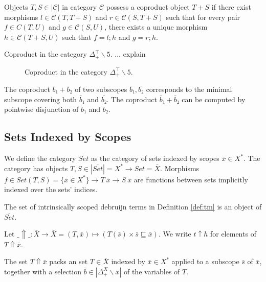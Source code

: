 \documentclass[runningheads]{llncs}
\begin{document}
\begin{definition}
  Objects $T, S ∈ |𝒞|$ in category $𝒞$ possess a coproduct object $T + S$ if there exist morphisms $l ∈ 𝒞(T, T + S)$ and $r ∈ 𝒞(S, T + S)$ such that for every pair $f ∈ C(T,U)$ and $g ∈ 𝒞(S,U)$, there exists a unique morphism $h ∈ 𝒞(T + S,U)$ such that $f = l;h$ and $g = r;h$.
\end{definition}
\begin{example}
  Coproduct in the category $Δ_+^⊤∖5$. ... explain
  \begin{figure}[h]
    \centering
    \caption{Coproduct in the category $Δ_+^⊤∖5$.}
    \label{fig:ex5}
  \end{figure}
\end{example}
\begin{remark}
  The coproduct $\bar{b}₁ + \bar{b}₂$ of two subscopes $\bar{b}₁, \bar{b₂}$ corresponds to the minimal subscope covering both $\bar{b}₁$ and $\bar{b₂}$.
  The coproduct $\bar{b}₁ + \bar{b}₂$ can be computed by pointwise disjunction of $\bar{b}₁$ and $\bar{b}₂$.
\end{remark}

\subsection{Sets Indexed by Scopes}

\begin{definition}
  We define the category $\overline{Set}$ as the category of sets indexed by scopes $\bar{x} ∈ X^*$. The category has objects $T, S ∈ |\overline{Set}| = X^* \to Set = \bar{X}$. Morphisms $f ∈ \overline{Set}(T, S) = \{\bar{x} ∈ X^*\} \to T \ \bar{x} \to S \ \bar{x}$ are functions between sets implicitly indexed over the sets' indices.
\end{definition}
\begin{example}
  The set of intrinsically scoped debruijn terms in Definition \ref{def:tm} is an object of $\overline{Set}$.
\end{example}
\begin{definition}
  Let $\_⇑\_ : \bar{X} → \bar{X} = (T, \bar{x}) ↦ (T(\bar{s}) × \bar{s} ⊑ \bar{x})$. We write $t ↑ h$ for elements of  $T ⇑ \bar{x}$.
\end{definition}
\begin{remark}
  The set $T⇑\bar{x}$ packs an set $T ∈ \bar{X}$ indexed by $\bar{x} ∈ X^*$ applied to a subscope $\bar{s}$ of $\bar{x}$, together with a selection $\bar{b} ∈ |Δ_+^X∖\bar{x}|$ of the variables of $T$.
\end{remark}
\end{document}
